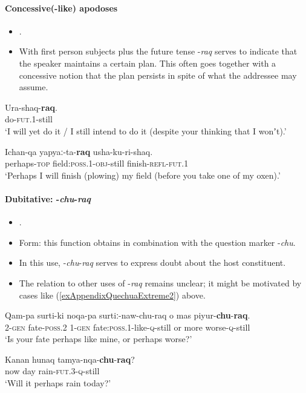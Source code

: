 \paragraph{Concessive(-like) apodoses}\label{appendixQuechuaConcessive}
\begin{itemize}
	\item \textcite[389–390]{Weber1989}.
	\item With first person subjects plus the future tense \mbox{-\textit{raq}} serves to indicate that the speaker maintains a certain plan. This often goes together with a concessive notion that the plan persists in spite of what the addressee may assume.
\end{itemize}

\begin{exe}
	\ex
	\gll Ura-shaq-\textbf{raq}.\\
	do-\textsc{fut}.1-still\\
	\glt \lq I will yet do it / I still intend to do it (despite your thinking that I wonʼt).' \parencite[389]{Weber1989}
	
	\ex
	\gll Ichan-qa yapyaː-ta-\textbf{raq} usha-ku-ri-shaq.\\
	perhaps-\textsc{top} field:\textsc{poss}.1-\textsc{obj}-still finish-\textsc{refl}-\textsc{fut}.1\\
	\glt \lq Perhaps I will finish (plowing) my field (before you take one of my oxen).' \parencite[389]{Weber1989}
\end{exe}

\paragraph{Dubitative: -\textit{chu}-\textit{raq}}
\label{appendixQuechuaDubitative}
\begin{itemize}
	\item \textcite[326–327]{Weber1989}.
	\item Form: this function obtains in combination with the question marker \mbox{-\textit{chu}}.
	\item In this use, \mbox{-\textit{chu}-\textit{raq}} serves to express doubt about the host constituent.
	\item The relation to other uses of \mbox{-\textit{raq}} remains unclear; it might be motivated by cases like (\ref{exAppendixQuechuaExtreme2}) above.
\end{itemize}

\begin{exe}
	\ex
	\gll Qam-pa surti-ki noqa-pa surtiː-naw-chu-raq o mas piyur-\textbf{chu}-\textbf{raq}.\\
	2-\textsc{gen} fate-\textsc{poss}.2 1-\textsc{gen} fate:\textsc{poss}.1-like-\textsc{q}-still or more worse-\textsc{q}-still\\
	\glt \lq Is your fate perhaps like mine, or perhaps worse?' \parencite[327]{Weber1989}
	
	\ex
	\gll Kanan hunaq tamya-nqa-\textbf{chu}-\textbf{raq}?\\
	now day rain-\textsc{fut}.3-\textsc{q}-still\\
	\glt \lq Will it perhaps rain today?' \parencite[327]{Weber1989}
\end{exe}

